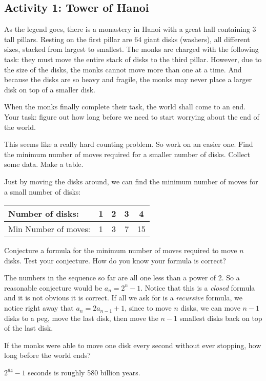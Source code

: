 \documentclass[11pt]{exam}
\begin{document}

\subsection*{Activity 1: Tower of Hanoi}

As the legend goes, there is a monastery in Hanoi with a great hall containing 3 tall pillars.  Resting on the first pillar are 64 giant disks (washers), all different sizes, stacked from largest to smallest.  The monks are charged with the following task: they must move the entire stack of disks to the third pillar.  However, due to the size of the disks, the monks cannot move more than one at a time.  And because the disks are so heavy and fragile, the monks may never place a larger disk on top of a smaller disk.

When the monks finally complete their task, the world shall come to an end.  Your task: figure out how long before we need to start worrying about the end of the world.

\begin{questions}
  \question This seems like a really hard counting problem.  So work on an easier one.  Find the minimum number of moves required for a smaller number of disks.  Collect some data. Make a table.

  \begin{solution}
  Just by moving the disks around, we can find the minimum number of moves for a small number of disks:

  \begin{center}
  \begin{tabular}{l|c|c|c|c}
  Number of disks: & 1 & 2 & 3 & 4 \\ \hline
  Min Number of moves: & 1 & 3 & 7 & 15
  \end{tabular}
  \end{center}
  \end{solution}
  \vfill
  \question Conjecture a formula for the minimum number of moves required to move $n$ disks.  Test your conjecture.  How do you know your formula is correct?
  \begin{solution}
	  The numbers in the sequence so far are all one less than a power of 2.  So a reasonable conjecture would be $a_n = 2^n - 1$.  Notice that this is a \emph{closed} formula and it is not obvious it is correct.  If all we ask for is a \emph{recursive} formula, we notice right away that $a_n = 2a_{n-1} + 1$, since to move $n$ disks, we can move $n-1$ disks to a peg, move the last disk, then move the $n-1$ smallest disks back on top of the last disk.
  \end{solution}

  \vfill
  \question If the monks were able to move one disk every second without ever stopping, how long before the world ends?

  \begin{solution}
	  $2^{64}-1$ seconds is roughly 580 billion years.
  \end{solution}

  \vfill

\end{questions}
\end{document}
